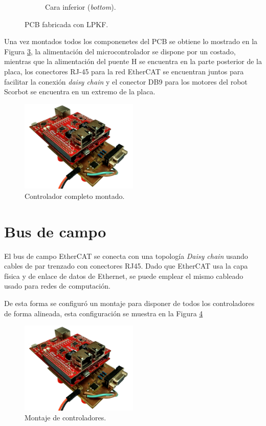 \begin{figure}[H]
\begin{subfigure}[b]{0.35\textwidth}
    \caption{Cara inferior (\textit{bottom}).}
    \label{cap4_bottom_pcb}
    \end{subfigure}
  \caption{PCB fabricada con LPKF\textregistered.}
  \label{cap4_pcb}
\end{figure}

Una vez montados todos los componenetes del PCB se obtiene lo mostrado en la Figura \ref{cap4_controlador_completo}, la alimentación del microcontrolador se dispone por un costado, mientras que la alimentación del puente H se encuentra en la parte posterior de la placa, los conectores RJ-45 para la red EtherCAT se encuentran juntos para facilitar la conexión \textit{daisy chain} y el conector DB9 para los motores del robot Scorbot se encuentra en un extremo de la placa. 

\begin{figure}[H]
  \centering
  \includegraphics[width=0.5\textwidth]{img/cap4/board}
  \caption{Controlador completo montado.}
  \label{cap4_controlador_completo}
\end{figure}

\section{Bus de campo}

El bus de campo EtherCAT se conecta con una topología \textit{Daisy chain} usando cables de par trenzado con conectores RJ45. Dado que EtherCAT usa la capa física y de enlace de datos de Ethernet, se puede emplear el mismo cableado usado para redes de computación.

De esta forma se configuró un montaje para disponer de todos los controladores de forma alineada, esta configuración se muestra en la Figura \ref{cap4_montaje}


\begin{figure}[H]
  \centering
  \includegraphics[width=0.5\textwidth]{img/cap4/board}
  \caption{Montaje de controladores.}
  \label{cap4_montaje}
\end{figure}

